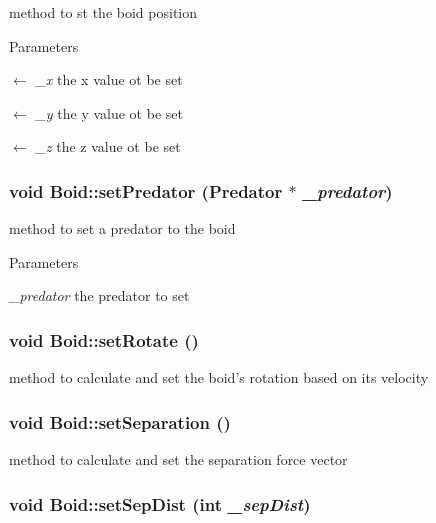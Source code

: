 method to st the boid position 
\begin{DoxyParams}{Parameters}
\item[\mbox{$\leftarrow$} {\em \_\-x}]the x value ot be set \item[\mbox{$\leftarrow$} {\em \_\-y}]the y value ot be set \item[\mbox{$\leftarrow$} {\em \_\-z}]the z value ot be set \end{DoxyParams}
\hypertarget{classBoid_a89ab1705165acc63295f63acd59fd79b}{
\subsubsection[{setPredator}]{\setlength{\rightskip}{0pt plus 5cm}void Boid::setPredator ({\bf Predator} $\ast$ {\em \_\-predator})}}
\label{classBoid_a89ab1705165acc63295f63acd59fd79b}


method to set a predator to the boid 
\begin{DoxyParams}{Parameters}
\item[{\em \_\-predator}]the predator to set \end{DoxyParams}
\hypertarget{classBoid_a03d008ad343ad4a7d2c6d3ba3c6556ee}{
\subsubsection[{setRotate}]{\setlength{\rightskip}{0pt plus 5cm}void Boid::setRotate ()}}
\label{classBoid_a03d008ad343ad4a7d2c6d3ba3c6556ee}


method to calculate and set the boid's rotation based on its velocity \hypertarget{classBoid_af68e960efe0425045524acf58d681ffb}{
\subsubsection[{setSeparation}]{\setlength{\rightskip}{0pt plus 5cm}void Boid::setSeparation ()}}
\label{classBoid_af68e960efe0425045524acf58d681ffb}


method to calculate and set the separation force vector \hypertarget{classBoid_a8b2d2ef70003c3b46c22ec3866f842ec}{
\subsubsection[{setSepDist}]{\setlength{\rightskip}{0pt plus 5cm}void Boid::setSepDist (int {\em \_\-sepDist})}}
\label{classBoid_a8b2d2ef70003c3b46c22ec3866f842ec}


